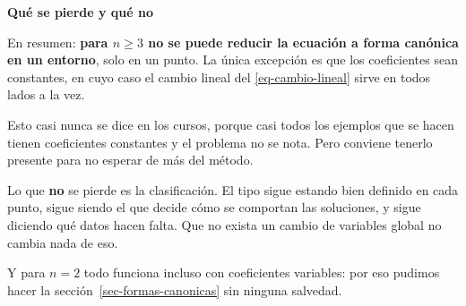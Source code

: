 \documentclass[
  spanish,
  a4paper,
]{scrbook}
\theoremstyle{definition}
\theoremstyle{plain}
\theoremstyle{definition}
\theoremstyle{plain}
\theoremstyle{definition}
\theoremstyle{remark}
\begin{document}
\begin{tcolorbox}[enhanced jigsaw, arc=.35mm, bottomrule=.15mm, breakable, colback=white, colframe=quarto-callout-warning-color-frame, left=2mm, leftrule=.75mm, opacityback=0, rightrule=.15mm, toprule=.15mm]
\begin{minipage}[t]{5.5mm}
\textcolor{quarto-callout-warning-color}{\faExclamationTriangle}
\end{minipage}%
\begin{minipage}[t]{\textwidth - 5.5mm}

\vspace{-3mm}\textbf{Qué se pierde y qué no}\vspace{3mm}

En resumen: \textbf{para \(n\ge 3\) no se puede reducir la ecuación a
forma canónica en un entorno}, solo en un punto. La única excepción es
que los coeficientes sean constantes, en cuyo caso el cambio lineal del
\ref{eq-cambio-lineal} sirve en todos lados a la vez.

Esto casi nunca se dice en los cursos, porque casi todos los ejemplos
que se hacen tienen coeficientes constantes y el problema no se nota.
Pero conviene tenerlo presente para no esperar de más del método.

Lo que \textbf{no} se pierde es la clasificación. El tipo sigue estando
bien definido en cada punto, sigue siendo el que decide cómo se
comportan las soluciones, y sigue diciendo qué datos hacen falta. Que no
exista un cambio de variables global no cambia nada de eso.

Y para \(n=2\) todo funciona incluso con coeficientes variables: por eso
pudimos hacer la sección~\ref{sec-formas-canonicas} sin ninguna
salvedad.

\end{minipage}%
\end{tcolorbox}
\end{document}
